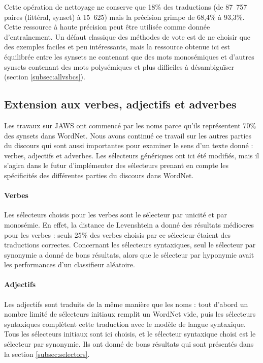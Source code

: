 Cette opération de nettoyage ne conserve que 18\% des traductions (de 87~757 paires (littéral, synset) à 15~625) mais la précision grimpe de 68,4\% à 93,3\%. Cette ressource à haute précision peut être utilisée comme donnée d'entraînement. Un défaut classique des méthodes de vote est de ne choisir que des exemples faciles et peu intéressants, mais la ressource obtenue ici est équilibrée entre les synsets ne contenant que des mots monosémiques et d'autres synsets contenant des mots polysémiques et plus difficiles à désambiguïser (section \ref{subsec:allvsbcs}).

\subsection{Extension aux verbes, adjectifs et adverbes}
\label{sec:extending_jaws}

Les travaux sur JAWS ont commencé par les noms parce qu'ils représentent 70\% des synsets dans WordNet. Nous avons continué ce travail sur les autres parties du discours qui sont aussi importantes pour examiner le sens d'un texte donné : verbes, adjectifs et adverbes. Les sélecteurs génériques ont ici été modifiés, mais il s'agira dans le futur d'implémenter des sélecteurs prenant en compte les spécificités des différentes parties du discours dans WordNet.

\paragraph{Verbes}
Les sélecteurs choisis pour les verbes sont le sélecteur par unicité et par monosémie. En effet, la distance de Levenshtein a donné des résultats médiocres pour les verbes : seuls 25\% des verbes choisis par ce sélecteur étaient des traductions correctes. Concernant les sélecteurs syntaxiques, seul le sélecteur par synonymie a donné de bons résultats, alors que le sélecteur par hyponymie avait les performances d'un classifieur aléatoire.

\paragraph{Adjectifs}
Les adjectifs sont traduits de la même manière que les noms : tout d'abord un nombre limité de sélecteurs initiaux remplit un WordNet vide, puis les sélecteurs syntaxiques complètent cette traduction avec le modèle de langue syntaxique. Tous les sélecteurs initiaux sont ici choisis, et le sélecteur syntaxique choisi est le sélecteur par synonymie. Ils ont donné de bons résultats qui sont présentés dans la section \ref{subsec:selectors}.

